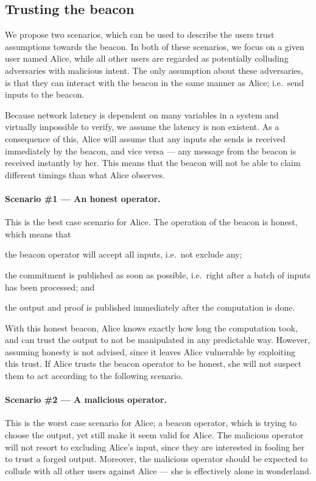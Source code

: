 \subsection{Trusting the beacon}%
\label{sub:trusting_the_beacon}

We propose two scenarios, which can be used to describe the users trust assumptions towards the beacon.
In both of these scenarios, we focus on a given user named Alice, while all other users are regarded as potentially colluding adversaries with malicious intent.
The only assumption about these adversaries, is that they can interact with the beacon in the same manner as Alice; i.e.\ send inputs to the beacon.

Because network latency is dependent on many variables in a system and virtually impossible to verify, we assume the latency is non existent.
As a consequence of this, Alice will assume that any inputs she sends is received immediately by the beacon, and vice versa --- any message from the beacon is received instantly by her.
This means that the beacon will not be able to claim different timings than what Alice observes.

\paragraph{Scenario \#1 --- An honest operator.}
This is the best case scenario for Alice.
The operation of the beacon is honest, which means that
\begin{eletterate*}
\item the beacon operator will accept all inputs, i.e.\ not exclude any;
\item the commitment is published as soon as possible, i.e.\ right after a batch of inputs has been processed; and
\item the output and proof is published immediately after the computation is done.
\end{eletterate*}

With this honest beacon, Alice knows exactly how long the computation took, and can trust the output to not be manipulated in any predictable way.
However, assuming honesty is not advised, since it leaves Alice vulnerable by exploiting this trust.
If Alice trusts the beacon operator to be honest, she will not suspect them to act according to the following scenario.

\paragraph{Scenario \#2 --- A malicious operator.}
This is the worst case scenario for Alice; a beacon operator, which is trying to choose the output, yet still make it seem valid for Alice.
The malicious operator will not resort to excluding Alice's input, since they are interested in fooling her to trust a forged output.
Moreover, the malicious operator should be expected to collude with all other users against Alice --- she is effectively alone in wonderland.

